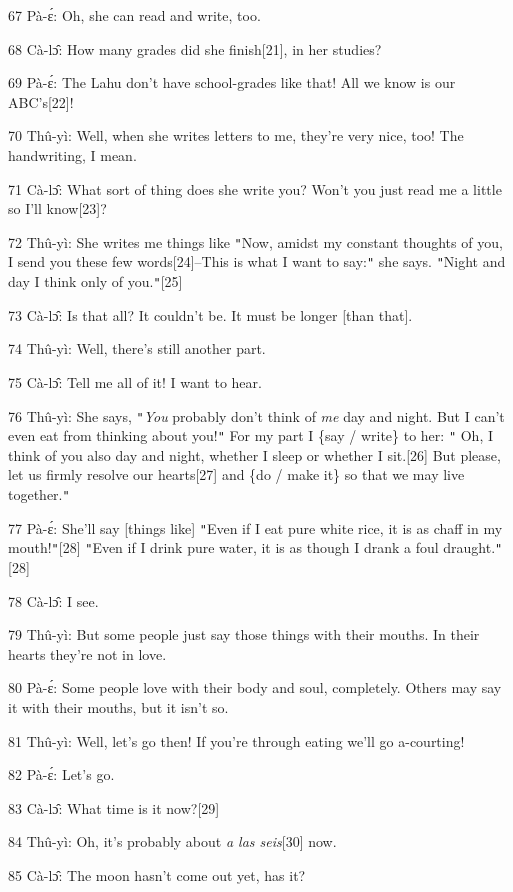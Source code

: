 67 Pà-ɛ́: Oh, she can read and write, too.

68 Cà-lɔ̂: How many grades did she finish[21], in her studies?

69 Pà-ɛ́: The Lahu don't have school-grades like that! All we know is our ABC's[22]!

70 Thû-yì: Well, when she writes letters to me, they're very nice, too! The handwriting,
I mean.

71 Cà-lɔ̂: What sort of thing does she write you? Won't you just read me a little
so I'll know[23]?

72 Thû-yì: She writes me things like \texttt{"}Now, amidst my constant thoughts
of you, I send you these few words[24]--This is what I want to say:\texttt{"} she
says. \texttt{"}Night and day I think only of you.\texttt{"}[25]

73 Cà-lɔ̂: Is that all? It couldn't be. It must be longer [than that].

74 Thû-yì: Well, there's still another part.

75 Cà-lɔ̂: Tell me all of it! I want to hear.

76 Thû-yì: She says, \texttt{"}\textit{You} probably don't think of \textit{me}
day and night. But I can't even eat from thinking about you!\texttt{"} For my part
I \{say / write\} to her: \texttt{"} Oh, I think of you also day and night, whether
I sleep or whether I sit.[26] But please, let us firmly resolve our hearts[27]
and \{do / make it\} so that we may live together.\texttt{"}

77 Pà-ɛ́: She'll say [things like] \texttt{"}Even if I eat pure white rice,
it is as chaff in my mouth!\texttt{"}[28] \texttt{"}Even if I drink pure water,
it is as though I drank a foul draught.\texttt{"}[28]

78 Cà-lɔ̂: I see.

79 Thû-yì: But some people just say those things with their mouths. In their
hearts they're not in love.

80 Pà-ɛ́: Some people love with their body and soul, completely. Others may
say it with their mouths, but it isn't so.

81 Thû-yì: Well, let's go then! If you're through eating we'll go a-courting!

82 Pà-ɛ́: Let's go.

83 Cà-lɔ̂: What time is it now?[29]

84 Thû-yì: Oh, it's probably about\textit{ a las seis}[30] now.

85 Cà-lɔ̂: The moon hasn't come out yet, has it?


